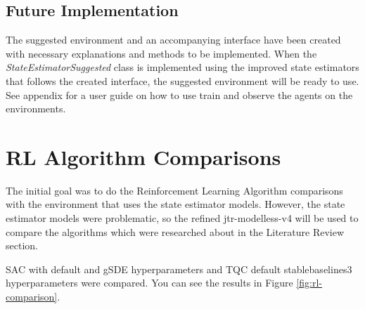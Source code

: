\documentclass[12pt,twoside]{report}
\begin{document}
\subsection{Future Implementation}
The suggested environment and an accompanying interface have been created with necessary explanations and methods to be implemented. When the \textit{StateEstimatorSuggested} class is implemented using the improved state estimators that follows the created interface, the suggested environment will be ready to use. See appendix for a user guide on how to use train and observe the agents on the environments.

\section{RL Algorithm Comparisons}
The initial goal was to do the Reinforcement Learning Algorithm comparisons with the environment that uses the state estimator models. However, the state estimator models were problematic, so the refined jtr-modelless-v4 will be used to compare the algorithms which were researched about in the Literature Review section.

SAC with default and gSDE hyperparameters and TQC default stablebaselines3 hyperparameters were compared. You can see the results in Figure \ref{fig:rl-comparison}.
\end{document}
